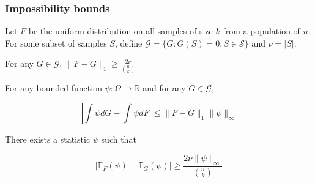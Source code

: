 \documentclass{beamer}
\newcommand{\reals}{\mathbb{R}}
\newcommand{\ex}{\mathbb{E}} %
\begin{document}
\begin{frame}[label = impossibility_bounds]
\frametitle{Impossibility bounds}
Let $F$ be the uniform distribution on all samples of size $k$ from a population of $n$.
For some subset of samples $S$,
define $\mathcal{G} = \{ G: G(S) = 0, S \in \mathcal{S}\}$ and $\nu = \lvert S \rvert$.


\begin{lemma}
For any $G \in \mathcal{G}$, $ \lVert F - G \rVert_1 \geq \frac{2\nu}{{n \choose k}}$
\end{lemma}


For any bounded function $\psi: \Omega \to \reals$ and for any $G \in \mathcal{G}$,

$$\left\lvert \int \psi dG - \int \psi dF \right\rvert \leq \lVert F - G \rVert_1 \lVert \psi \rVert_\infty$$


\begin{corollary}
There exists a statistic $\psi$ such that

$$\left\lvert  \ex_F(\psi) - \ex_G(\psi) \right\rvert \geq  \frac{2\nu \lVert \psi \rVert_\infty}{{n \choose k}}$$
\end{corollary}

\hyperlink{pigeonhole}{}

\end{frame}
\end{document}

